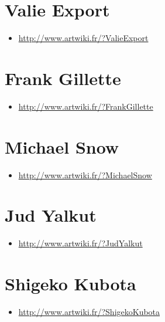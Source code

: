 \documentclass[
]{book}
\providecommand{\tightlist}{%
  \setlength{\itemsep}{0pt}\setlength{\parskip}{0pt}}
\begin{document}
\hypertarget{valie-export}{%
\section{Valie Export}\label{valie-export}}

\begin{itemize}
\tightlist
\item
  \url{http://www.artwiki.fr/?ValieExport}
\end{itemize}

\hypertarget{frank-gillette}{%
\section{Frank Gillette}\label{frank-gillette}}

\begin{itemize}
\tightlist
\item
  \url{http://www.artwiki.fr/?FrankGillette}
\end{itemize}

\hypertarget{michael-snow}{%
\section{Michael Snow}\label{michael-snow}}

\begin{itemize}
\tightlist
\item
  \url{http://www.artwiki.fr/?MichaelSnow}
\end{itemize}

\hypertarget{jud-yalkut}{%
\section{Jud Yalkut}\label{jud-yalkut}}

\begin{itemize}
\tightlist
\item
  \url{http://www.artwiki.fr/?JudYalkut}
\end{itemize}

\hypertarget{shigeko-kubota}{%
\section{Shigeko Kubota}\label{shigeko-kubota}}

\begin{itemize}
\tightlist
\item
  \url{http://www.artwiki.fr/?ShigekoKubota}
\end{itemize}
\end{document}

